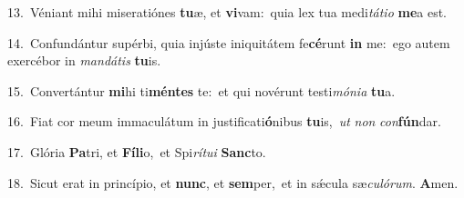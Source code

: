 {\numbfont\textcolor{\numbcolor}{13.}}~Véniant mihi miseratiónes \textbf{tu}\-æ, et \textbf{vi}\-vam:~\star quia lex tua medi\-\textit{tá}\-\textit{ti}\textit{o} \textbf{me}\-a est.\par
{\numbfont\textcolor{\numbcolor}{14.}}~Confundántur supérbi, quia injúste iniquitátem fe\-\textbf{cé}\-runt \textbf{in} me:~\star ego autem exercébor in \textit{man}\-\textit{dá}\textit{tis} \textbf{tu}\-is.\par
{\numbfont\textcolor{\numbcolor}{15.}}~Convertántur \textbf{mi}\-hi ti\-\textbf{mén}\-\textbf{tes} te:~\star et qui novérunt testi\-\textit{mó}\-\textit{ni}\textit{a} \textbf{tu}\-a.\par
{\numbfont\textcolor{\numbcolor}{16.}}~Fiat cor meum immaculátum in justificati\-\textbf{ó}\-nibus \textbf{tu}\-is,~\star \textit{ut} \textit{non} \textit{con}\-\textbf{fún}dar.\par
{\numbfont\textcolor{\numbcolor}{17.}}~Glória \textbf{Pa}\-tri, et \textbf{Fí}\-\textbf{li}o,~\star et Spi\-\textit{rí}\-\textit{tu}\textit{i} \textbf{Sanc}\-to.\par
{\numbfont\textcolor{\numbcolor}{18.}}~Sicut erat in princípio, et \textbf{nunc}\-, et \textbf{sem}\-per,~\star et in sǽcula sæ\-\textit{cu}\-\textit{ló}\textit{rum}. \textbf{A}\-men.\par
